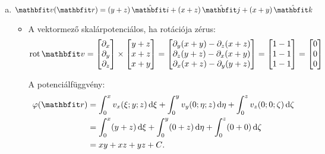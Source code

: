 \documentclass{szb-solution}
\begin{document}
\begin{enumerate}[a)]
  \item $\rvec v(\coordvec) = \ijk{y + z}{x + z}{x + y}$
        \begin{itemize}
          \item A vektormező skalárpotenciálos, ha rotációja zérus:
                $$
                  \rot \rvec v
                  =
                  \begin{bmatrix}
                    \partial_x \\ \partial_y \\ \partial_z
                  \end{bmatrix}
                  \times
                  \begin{bmatrix}
                    y + z \\ x + z \\ x + y
                  \end{bmatrix}
                  =
                  \begin{bmatrix}
                    \partial_y (x + y) - \partial_z (x + z) \\
                    \partial_z (y + z) - \partial_x (x + y) \\
                    \partial_x (x + z) - \partial_y (y + z)
                  \end{bmatrix}
                  =
                  \begin{bmatrix}
                    1 - 1 \\
                    1 - 1 \\
                    1 - 1
                  \end{bmatrix}
                  =
                  \begin{bmatrix}
                    0 \\ 0 \\ 0
                  \end{bmatrix}
                $$

                A potenciálfüggvény:
                \begin{align*}
                  \varphi(\coordvec)
                   & =
                  \int_0^x v_x(\xi; y; z) \dd \xi +
                  \int_0^y v_y(0; \eta; z) \dd \eta +
                  \int_0^z v_z(0; 0; \zeta) \dd \zeta
                  \\
                   & =
                  \int_0^x (y + z) \dd \xi +
                  \int_0^y (0 + z) \dd \eta +
                  \int_0^z (0 + 0) \dd \zeta
                  \\
                   & =
                  xy + xz + yz + C
                  \text.
                \end{align*}


\end{itemize}
\end{enumerate}
\end{document}
